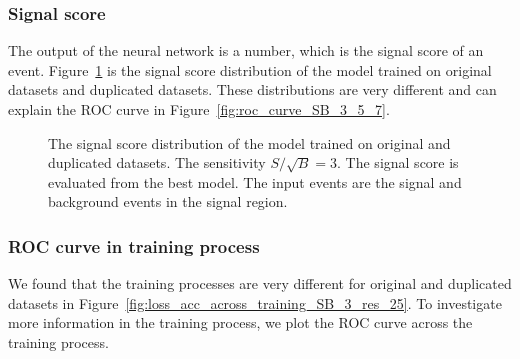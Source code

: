 \documentclass[12pt]{article}
\begin{document}
		\subsubsection{Signal score}%
		\label{subs:signal_score}
			The output of the neural network is a number, which is the signal score of an event. Figure~\ref{fig:signal_score_SB_3} is the signal score distribution of the model trained on original datasets and duplicated datasets. These distributions are very different and can explain the ROC curve in Figure~\ref{fig:roc_curve_SB_3_5_7}.
			\begin{figure}[htpb]
				\centering
				\caption{The signal score distribution of the model trained on original and duplicated datasets. The sensitivity $S / \sqrt{B} = 3$. The signal score is evaluated from the best model. The input events are the signal and background events in the signal region.}
				\label{fig:signal_score_SB_3}
			\end{figure}
		\subsubsection{ROC curve in training process}%
		\label{subs:roc_curve_in_training_process}
			We found that the training processes are very different for original and duplicated datasets in Figure~\ref{fig:loss_acc_across_training_SB_3_res_25}. To investigate more information in the training process, we plot the ROC curve across the training process.
\end{document}
